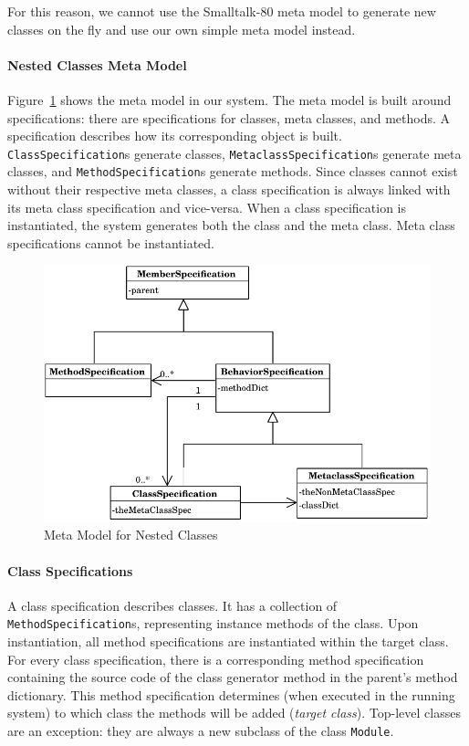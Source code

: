 For this reason, we cannot use the Smalltalk-80 meta model to generate new classes on the fly and use our own simple meta model instead.

\paragraph{Nested Classes Meta Model}
Figure~\ref{fig:impl_meta_model} shows the meta model in our system. The meta model is built around specifications: there are specifications for classes, meta classes, and methods. A specification describes how its corresponding object is built. \texttt{ClassSpecification}s generate classes, \texttt{MetaclassSpecification}s generate meta classes, and \texttt{MethodSpecification}s generate methods. Since classes cannot exist without their respective meta classes, a class specification is always linked with its meta class specification and vice-versa. When a class specification is instantiated, the system generates both the class and the meta class. Meta class specifications cannot be instantiated.

\begin{figure}
	\centering
	\includegraphics[scale=1]{metamodel.pdf}
	\caption{Meta Model for Nested Classes}
	\label{fig:impl_meta_model}
\end{figure}

\paragraph{Class Specifications}
A class specification describes classes. It has a collection of \texttt{MethodSpecification}s, representing instance methods of the class. Upon instantiation, all method specifications are instantiated within the target class. For every class specification, there is a corresponding method specification containing the source code of the class generator method in the parent's method dictionary. This method specification determines (when executed in the running system) to which class the methods will be added (\emph{target class}). Top-level classes are an exception: they are always a new subclass of the class \texttt{Module}.

